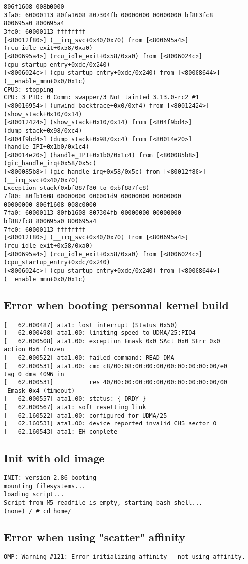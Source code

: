 \documentclass{article}
\begin{document}
\begin{lstlisting}
806f1608 008b0000
3fa0: 60000113 80fa1608 807304fb 00000000 00000000 bf883fc8
800695a0 800695a4
3fc0: 60000113 ffffffff
[<80012f80>] (__irq_svc+0x40/0x70) from [<800695a4>]
(rcu_idle_exit+0x58/0xa0)
[<800695a4>] (rcu_idle_exit+0x58/0xa0) from [<8006024c>] 
(cpu_startup_entry+0xdc/0x240)
[<8006024c>] (cpu_startup_entry+0xdc/0x240) from [<80008644>] 
(__enable_mmu+0x0/0x1c)
CPU3: stopping
CPU: 3 PID: 0 Comm: swapper/3 Not tainted 3.13.0-rc2 #1
[<80016954>] (unwind_backtrace+0x0/0xf4) from [<80012424>] 
(show_stack+0x10/0x14)
[<80012424>] (show_stack+0x10/0x14) from [<804f9bd4>]
(dump_stack+0x98/0xc4)
[<804f9bd4>] (dump_stack+0x98/0xc4) from [<80014e20>]
(handle_IPI+0x1b0/0x1c4)
[<80014e20>] (handle_IPI+0x1b0/0x1c4) from [<800085b8>] 
(gic_handle_irq+0x58/0x5c)
[<800085b8>] (gic_handle_irq+0x58/0x5c) from [<80012f80>]
(__irq_svc+0x40/0x70)
Exception stack(0xbf887f80 to 0xbf887fc8)
7f80: 80fb1608 00000000 000001d9 00000000 00000000
00000000 806f1608 008c0000
7fa0: 60000113 80fb1608 807304fb 00000000 00000000
bf887fc8 800695a0 800695a4
7fc0: 60000113 ffffffff
[<80012f80>] (__irq_svc+0x40/0x70) from [<800695a4>]
(rcu_idle_exit+0x58/0xa0)
[<800695a4>] (rcu_idle_exit+0x58/0xa0) from [<8006024c>] 
(cpu_startup_entry+0xdc/0x240)
[<8006024c>] (cpu_startup_entry+0xdc/0x240) from [<80008644>] 
(__enable_mmu+0x0/0x1c)
\end{lstlisting}

\subsection{Error when booting personnal kernel build}
\begin{lstlisting}
[   62.000487] ata1: lost interrupt (Status 0x50)
[   62.000498] ata1.00: limiting speed to UDMA/25:PIO4
[   62.000508] ata1.00: exception Emask 0x0 SAct 0x0 SErr 0x0 
action 0x6 frozen
[   62.000522] ata1.00: failed command: READ DMA
[   62.000531] ata1.00: cmd c8/00:08:00:00:00/00:00:00:00:00/e0 
tag 0 dma 4096 in
[   62.000531]          res 40/00:00:00:00:00/00:00:00:00:00/00
 Emask 0x4 (timeout)
[   62.000557] ata1.00: status: { DRDY }
[   62.000567] ata1: soft resetting link
[   62.160522] ata1.00: configured for UDMA/25
[   62.160531] ata1.00: device reported invalid CHS sector 0
[   62.160543] ata1: EH complete
\end{lstlisting}

\subsection{Init with old image}
\begin{lstlisting}
INIT: version 2.86 booting
mounting filesystems...
loading script...
Script from M5 readfile is empty, starting bash shell...
(none) / # cd home/
\end{lstlisting}

\subsection{Error when using "scatter" affinity}
\begin{lstlisting}
OMP: Warning #121: Error initializing affinity - not using affinity.
\end{lstlisting}
\end{document}
